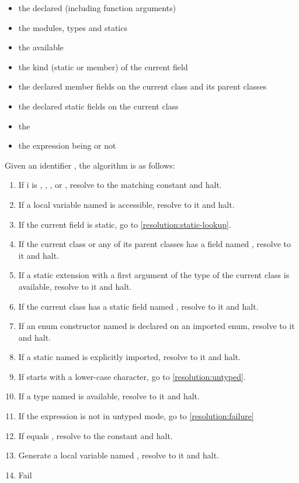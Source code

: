 \begin{itemize}
	\item the declared  (including function arguments)
	\item the  modules, types and statics
	\item the available 
	\item the kind (static or member) of the current field
	\item the declared member fields on the current class and its parent classes
	\item the declared static fields on the current class
	\item the 
	\item the expression being  or not
\end{itemize}




Given an identifier , the algorithm is as follows:

\begin{enumerate}
	\item If i is , , ,  or , resolve to the matching constant and halt.
	\item If a local variable named  is accessible, resolve to it and halt.
	\item If the current field is static, go to \ref{resolution:static-lookup}.
	\item If the current class or any of its parent classes has a field named , resolve to it and halt.
	\item\label{resolution:static-extension} If a static extension with a first argument of the type of the current class is available, resolve to it and halt.
	\item\label{resolution:static-lookup} If the current class has a static field named , resolve to it and halt.
	\item\label{resolution:enum-ctor} If an enum constructor named  is declared on an imported enum, resolve to it and halt.
	\item If a static named  is explicitly imported, resolve to it and halt.
	\item If  starts with a lower-case character, go to \ref{resolution:untyped}.
	\item\label{resolution:type} If a type named  is available, resolve to it and halt.
	\item\label{resolution:untyped} If the expression is not in untyped mode, go to \ref{resolution:failure}
	\item If  equals , resolve to the  constant and halt.
	\item Generate a local variable named , resolve to it and halt.
	\item\label{resolution:failure} Fail
\end{enumerate}

